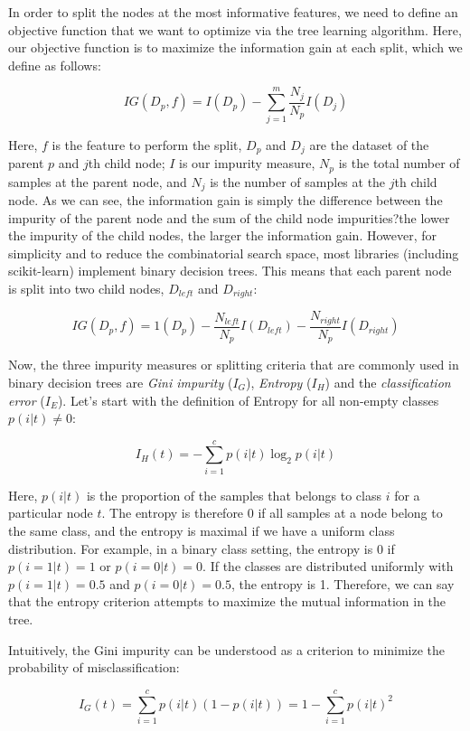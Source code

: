 \documentclass[letterpaper]{report}
\begin{document}
In order to split the nodes at the most informative features, we need to define an objective function that we want to optimize via the tree learning algorithm. Here, our objective function is to maximize the information gain at each split, which we define as follows:

\[
IG(D_p, f) = I(D_p) - \sum_{j=1}^{m} \frac{N_j}{N_p} I(D_j)
\]

Here, $f$ is the feature to perform the split, $D_p$ and $D_j$ are the dataset of the parent $p$ and $j$th child node; $I$ is our impurity measure, $N_p$ is the total number of samples at the parent node, and $N_j$ is the number of samples at the $j$th child node.  As we can see, the information gain is simply the difference between the impurity of the parent node and the sum of the child node impurities?the lower the impurity of the child nodes, the larger the information gain. However, for simplicity and to reduce the combinatorial search space, most libraries (including scikit-learn) implement binary decision trees. This means that each parent node is split into two child nodes, $D_{left}$ and $D_{right}$:

\[
IG(D_p, f) = 1 (D_p) - \frac{N_{left}}{N_p} I(D_{left}) - \frac{N_{right}}{N_p} I (D_{right})
\]

Now, the three impurity measures or splitting criteria that are commonly used in
binary decision trees are \textit{Gini impurity} ($I_G$), \textit{Entropy} ($I_H$) and the \textit{classification error} ($I_E$). Let's start with the definition of Entropy for all non-empty classes $p(i | t) \neq 0$:


\[
I_H(t) = - \sum_{i=1}^{c} p(i | t) \log_2 p(i|t)
\]

Here, $p(i | t)$ is the proportion of the samples that belongs to class $i$ for a particular node $t$. The entropy is therefore 0 if all samples at a node belong to the same class, and the entropy is maximal if we have a uniform class distribution. For example, in a binary class setting, the entropy is 0 if $p(i=1 | t) = 1$ or $p(i=0| t)=0$. If the classes are distributed uniformly with $p(i=1|t)=0.5$ and $p(i=0|t)=0.5$, the entropy is 1. Therefore, we can say that the entropy criterion attempts to maximize the mutual information in the tree.

Intuitively, the Gini impurity can be understood as a criterion to minimize the probability of misclassification:

\[
I_G(t) = \sum_{i=1}^{c} p(i | t) (1 - p (i | t)) = 1 - \sum_{i=1}^{c} p(i|t)^2
\]
\end{document}
